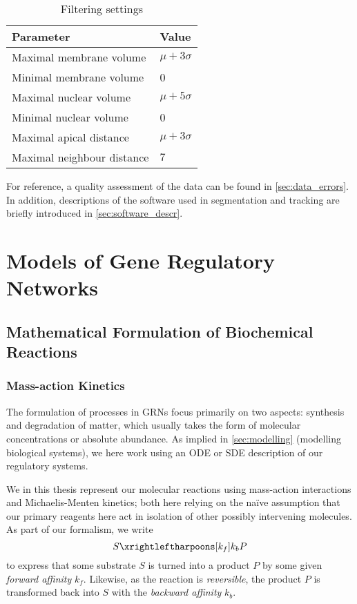 \begin{table}
  \centering
  \begin{tabular}{ll}                            \toprule
    \textbf{Parameter} & \textbf{Value}       \\ \midrule
    Maximal membrane volume & $\mu + 3\sigma$ \\
    Minimal membrane volume & 0 \\
    Maximal nuclear volume  & $\mu + 5\sigma$ \\
    Minimal nuclear volume  & 0 \\
    Maximal apical distance & $\mu + 3\sigma$ \\
    Maximal neighbour distance & $7$          \\ \bottomrule   
  \end{tabular}
  \caption{Filtering settings}
  \label{tab:filtering}
\end{table}

For reference, a quality assessment of the data can be found in
\cref{sec:data_errors}. In addition, descriptions of the software used in
segmentation and tracking are briefly introduced in \cref{sec:software_descr}.

\section[Models of Gene Regulatory Networks]{Models of Gene Regulatory Networks}
\subsection[Mathematical Formulation]{Mathematical Formulation of Biochemical
  Reactions}

\subsubsection[Mass-action Kinetics]{Mass-action Kinetics}
The formulation of processes in GRNs focus primarily on two aspects: synthesis
and degradation of matter, which usually takes the form of molecular
concentrations or absolute abundance. As implied in \cref{sec:modelling}
(modelling biological systems), we here work using an ODE or SDE description of
our regulatory systems. 

We in this thesis represent our molecular reactions using mass-action
interactions and Michaelis-Menten kinetics; both here relying on the na\"ive
assumption that our primary reagents here act in isolation of other possibly
intervening molecules. As part of our formalism, we write
\begin{equation}
  S \xrightleftharpoons[k_{f}]{k_{b}} P
  \label{eq:simple_reac}
\end{equation}
to express that some substrate $S$ is turned into a product $P$ by some given
\textit{forward affinity} $k_f$. Likewise, as the reaction is \textit{reversible}, the
product $P$ is transformed back into $S$ with the \textit{backward affinity}
$k_b$. 

